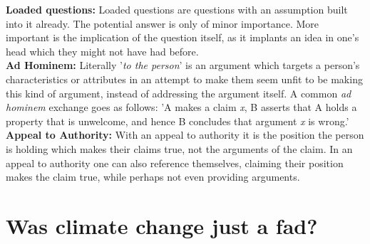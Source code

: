 \documentclass{article}
\begin{document}
\begin{multicols}{3}
	\textbf{Loaded questions:} Loaded questions are questions with an assumption built into it already. The potential answer is only of minor importance. More important is the implication of the question itself, as it implants an idea in one's head which they might not have had before. \\

	\textbf{Ad Hominem:} Literally '\textit{to the person}' is an argument which targets a person's characteristics or attributes in an attempt to make them seem unfit to be making this kind of argument, instead of addressing the argument itself. A common \textit{ad hominem} exchange goes as follows: 'A makes a claim \textit{x}, B asserts that A holds a property that is unwelcome, and hence B concludes that argument \textit{x} is wrong.'\\
	\textbf{Appeal to Authority:} With an appeal to authority it is the position the person is holding which makes their claims true, not the arguments of the claim. In an appeal to authority one can also reference themselves, claiming their position makes the claim true, while perhaps not even providing arguments.\\
	\columnbreak
	\section*{Was climate change just a fad?} 

\end{multicols}
\end{document}
